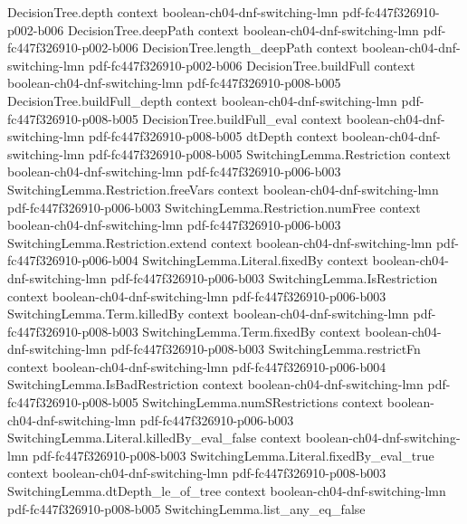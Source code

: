 \begin{theorem}
\proofstep
  {DecisionTree.depth}
  {context}
  {boolean-ch04-dnf-switching-lmn}
  {pdf-fc447f326910-p002-b006}
\proofstep
  {DecisionTree.deepPath}
  {context}
  {boolean-ch04-dnf-switching-lmn}
  {pdf-fc447f326910-p002-b006}
\proofstep
  {DecisionTree.length_deepPath}
  {context}
  {boolean-ch04-dnf-switching-lmn}
  {pdf-fc447f326910-p002-b006}
\proofstep
  {DecisionTree.buildFull}
  {context}
  {boolean-ch04-dnf-switching-lmn}
  {pdf-fc447f326910-p008-b005}
\proofstep
  {DecisionTree.buildFull_depth}
  {context}
  {boolean-ch04-dnf-switching-lmn}
  {pdf-fc447f326910-p008-b005}
\proofstep
  {DecisionTree.buildFull_eval}
  {context}
  {boolean-ch04-dnf-switching-lmn}
  {pdf-fc447f326910-p008-b005}
\proofstep
  {dtDepth}
  {context}
  {boolean-ch04-dnf-switching-lmn}
  {pdf-fc447f326910-p008-b005}
\proofstep
  {SwitchingLemma.Restriction}
  {context}
  {boolean-ch04-dnf-switching-lmn}
  {pdf-fc447f326910-p006-b003}
\proofstep
  {SwitchingLemma.Restriction.freeVars}
  {context}
  {boolean-ch04-dnf-switching-lmn}
  {pdf-fc447f326910-p006-b003}
\proofstep
  {SwitchingLemma.Restriction.numFree}
  {context}
  {boolean-ch04-dnf-switching-lmn}
  {pdf-fc447f326910-p006-b003}
\proofstep
  {SwitchingLemma.Restriction.extend}
  {context}
  {boolean-ch04-dnf-switching-lmn}
  {pdf-fc447f326910-p006-b004}
\proofstep
  {SwitchingLemma.Literal.fixedBy}
  {context}
  {boolean-ch04-dnf-switching-lmn}
  {pdf-fc447f326910-p006-b003}
\proofstep
  {SwitchingLemma.IsRestriction}
  {context}
  {boolean-ch04-dnf-switching-lmn}
  {pdf-fc447f326910-p006-b003}
\proofstep
  {SwitchingLemma.Term.killedBy}
  {context}
  {boolean-ch04-dnf-switching-lmn}
  {pdf-fc447f326910-p008-b003}
\proofstep
  {SwitchingLemma.Term.fixedBy}
  {context}
  {boolean-ch04-dnf-switching-lmn}
  {pdf-fc447f326910-p008-b003}
\proofstep
  {SwitchingLemma.restrictFn}
  {context}
  {boolean-ch04-dnf-switching-lmn}
  {pdf-fc447f326910-p006-b004}
\proofstep
  {SwitchingLemma.IsBadRestriction}
  {context}
  {boolean-ch04-dnf-switching-lmn}
  {pdf-fc447f326910-p008-b005}
\proofstep
  {SwitchingLemma.numSRestrictions}
  {context}
  {boolean-ch04-dnf-switching-lmn}
  {pdf-fc447f326910-p006-b003}
\proofstep
  {SwitchingLemma.Literal.killedBy_eval_false}
  {context}
  {boolean-ch04-dnf-switching-lmn}
  {pdf-fc447f326910-p008-b003}
\proofstep
  {SwitchingLemma.Literal.fixedBy_eval_true}
  {context}
  {boolean-ch04-dnf-switching-lmn}
  {pdf-fc447f326910-p008-b003}
\proofstep
  {SwitchingLemma.dtDepth_le_of_tree}
  {context}
  {boolean-ch04-dnf-switching-lmn}
  {pdf-fc447f326910-p008-b005}
\proofstep
  {SwitchingLemma.list_any_eq_false}

\end{theorem}
